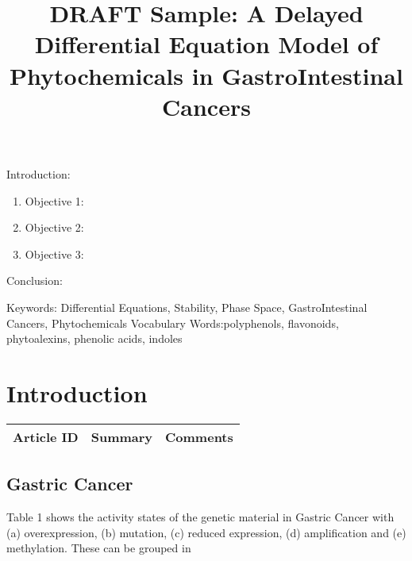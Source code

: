 

\twocolumn
\scriptsize
\begin{frontmatter}
		\title{DRAFT Sample: A Delayed Differential Equation Model of Phytochemicals in GastroIntestinal Cancers}
		\author{}
		\address{The Mathematical Learning Space}
\end{frontmatter}	

Introduction:
\begin{enumerate}
\item Objective 1:
\item Objective 2:
\item Objective 3:
\end{enumerate}
Conclusion:

Keywords: Differential Equations, Stability, Phase Space, GastroIntestinal Cancers, Phytochemicals
Vocabulary Words:polyphenols, flavonoids, phytoalexins, phenolic acids, indoles 

\section{Introduction}

\begin{table}[H]\centering
	\begin{tabular}{p{1cm}p{4cm}p{3cm}}
		Article ID & Summary & Comments\\
		\hline
		\hline
	\end{tabular}
\end{table}


\subsection{Gastric Cancer}

Table 1 shows the activity states of the genetic material in Gastric Cancer with (a) overexpression, (b) mutation, (c) reduced expression, (d) amplification and (e) methylation.  These can be grouped in 


